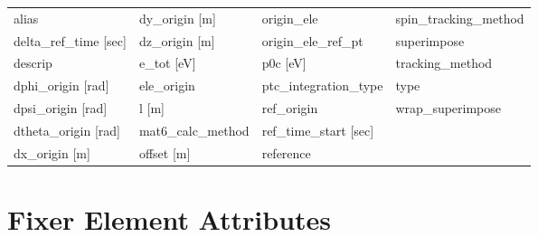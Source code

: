  \begin{tabular}{llll} \toprule
alias                            & dy_origin [m]                    & origin_ele                       & spin_tracking_method             \\
delta_ref_time [sec]             & dz_origin [m]                    & origin_ele_ref_pt                & superimpose                      \\
descrip                          & e_tot [eV]                       & p0c [eV]                         & tracking_method                  \\
dphi_origin [rad]                & ele_origin                       & ptc_integration_type             & type                             \\
dpsi_origin [rad]                & l [m]                            & ref_origin                       & wrap_superimpose                 \\
dtheta_origin [rad]              & mat6_calc_method                 & ref_time_start [sec]             &                                  \\
dx_origin [m]                    & offset [m]                       & reference                        &                                  \\
 \bottomrule
 \end{tabular}
 \vfill
 
 \section{Fixer Element Attributes}
 \label{s:list.fixer}
 
